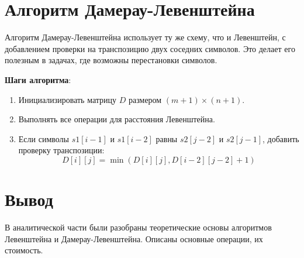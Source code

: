 \section{Алгоритм Дамерау-Левенштейна}

Алгоритм Дамерау-Левенштейна использует ту же схему, что и Левенштейн, с добавлением проверки на транспозицию двух соседних символов. Это делает его полезным в задачах, где возможны перестановки символов.

\vspace{0.5cm}
\textbf{Шаги алгоритма}:
\begin{enumerate}
    \item Инициализировать матрицу $D$ размером $(m+1) \times (n+1)$.
    \item Выполнять все операции для расстояния Левенштейна.
    \item Если символы $s1[i-1]$ и $s1[i-2]$ равны $s2[j-2]$ и $s2[j-1]$, добавить проверку транспозиции:
    \begin{equation}
        D[i][j] = \min(D[i][j], D[i-2][j-2] + 1)
    \end{equation}
\end{enumerate}



\section*{Вывод}

В аналитической части были разобраны теоретические основы алгоритмов Левенштейна и Дамерау-Левенштейна. Описаны основные операции, их стоимость.
